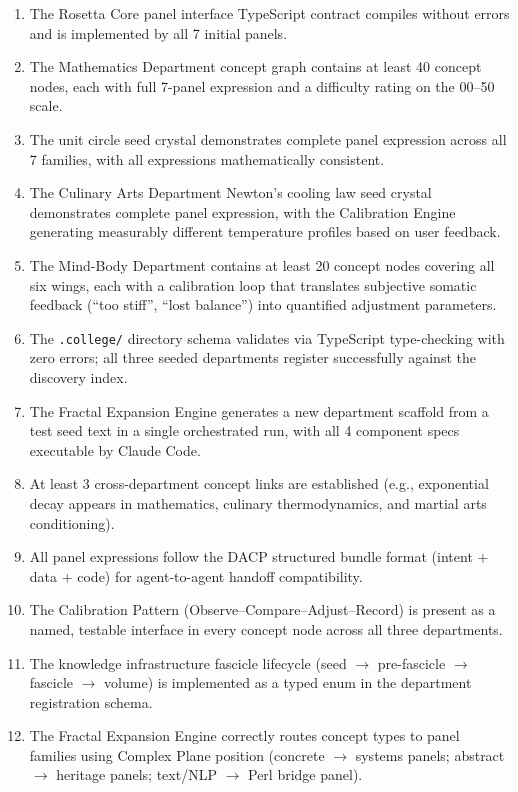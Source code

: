 \documentclass[11pt,letterpaper]{article}
\begin{document}
\begin{enumerate}[leftmargin=1.5em]
  \item The Rosetta Core panel interface TypeScript contract compiles without errors and is implemented by all 7 initial panels.
  \item The Mathematics Department concept graph contains at least 40 concept nodes, each with full 7-panel expression and a difficulty rating on the 00--50 scale.
  \item The unit circle seed crystal demonstrates complete panel expression across all 7 families, with all expressions mathematically consistent.
  \item The Culinary Arts Department Newton's cooling law seed crystal demonstrates complete panel expression, with the Calibration Engine generating measurably different temperature profiles based on user feedback.
  \item The Mind-Body Department contains at least 20 concept nodes covering all six wings, each with a calibration loop that translates subjective somatic feedback (``too stiff'', ``lost balance'') into quantified adjustment parameters.
  \item The \texttt{.college/} directory schema validates via TypeScript type-checking with zero errors; all three seeded departments register successfully against the discovery index.
  \item The Fractal Expansion Engine generates a new department scaffold from a test seed text in a single orchestrated run, with all 4 component specs executable by Claude Code.
  \item At least 3 cross-department concept links are established (e.g., exponential decay appears in mathematics, culinary thermodynamics, and martial arts conditioning).
  \item All panel expressions follow the DACP structured bundle format (intent + data + code) for agent-to-agent handoff compatibility.
  \item The Calibration Pattern (Observe--Compare--Adjust--Record) is present as a named, testable interface in every concept node across all three departments.
  \item The knowledge infrastructure fascicle lifecycle (seed $\rightarrow$ pre-fascicle $\rightarrow$ fascicle $\rightarrow$ volume) is implemented as a typed enum in the department registration schema.
  \item The Fractal Expansion Engine correctly routes concept types to panel families using Complex Plane position (concrete $\rightarrow$ systems panels; abstract $\rightarrow$ heritage panels; text/NLP $\rightarrow$ Perl bridge panel).
\end{enumerate}
\end{document}
